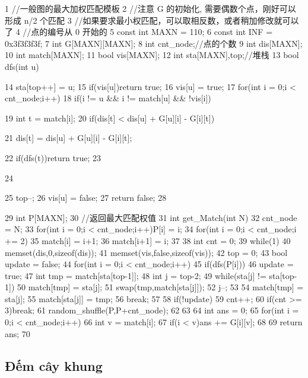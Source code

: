 \documentclass[11pt]{article}
\begin{document}
\begin{Code}
 1    //一般图的最大加权匹配模板
 2    //注意 G 的初始化, 需要偶数个点，刚好可以形成 n/2 个匹配
 3    //如果要求最小权匹配，可以取相反数，或者稍加修改就可以了
 4    //点的编号从 0 开始的
 5    const int MAXN = 110;
 6    const int INF = 0x3f3f3f3f;
 7    int G[MAXN][MAXN];
 8    int cnt_node;//点的个数
 9    int dis[MAXN];
10    int match[MAXN];
11    bool vis[MAXN];
12    int sta[MAXN],top;//堆栈
13    bool dfs(int u){
14        sta[top++] = u;
15        if(vis[u])return true;
16        vis[u] = true;
17        for(int i = 0;i < cnt_node;i++)
18            if(i != u && i != match[u] && !vis[i]){
19                int t = match[i];
20                if(dis[t] < dis[u] + G[u][i] - G[i][t]){
21                     dis[t] = dis[u] + G[u][i] - G[i][t];


22                   if(dfs(t))return true;
23               }
24           }
25       top--;
26       vis[u] = false;
27       return false;
28   }
29   int P[MAXN];
30   //返回最大匹配权值
31   int get_Match(int N){
32       cnt_node = N;
33       for(int i = 0;i < cnt_node;i++)P[i] = i;
34       for(int i = 0;i < cnt_node;i += 2){
35           match[i] = i+1;
36           match[i+1] = i;
37       }
38       int cnt = 0;
39       while(1){
40           memset(dis,0,sizeof(dis));
41           memset(vis,false,sizeof(vis));
42           top = 0;
43           bool update = false;
44           for(int i = 0;i < cnt_node;i++)
45                if(dfs(P[i])){
46                    update = true;
47                    int tmp = match[sta[top-1]];
48                    int j = top-2;
49                    while(sta[j] != sta[top-1]){
50                        match[tmp] = sta[j];
51                        swap(tmp,match[sta[j]]);
52                        j--;
53                    }
54                    match[tmp] = sta[j];
55                    match[sta[j]] = tmp;
56                    break;
57                }
58           if(!update){
59                cnt++;
60                if(cnt >= 3)break;
61                random_shuffle(P,P+cnt_node);
62           }
63       }
64       int ans = 0;
65       for(int i = 0;i < cnt_node;i++){
66           int v = match[i];
67           if(i < v)ans += G[i][v];
68       }
69       return ans;
70   }
\end{Code}

\subsection{Đếm cây khung}
\end{document}

